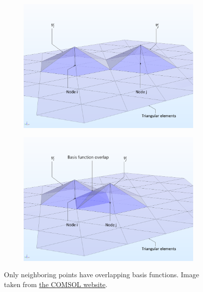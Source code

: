 \documentclass[12pt]{article}
\begin{document}
\begin{figure}
    \centering
    \begin{subfigure}{0.49\linewidth}
        \centering
        \includegraphics[width=\textwidth]{figures/triangle_overlap_1}
    \end{subfigure}
    \begin{subfigure}{0.49\linewidth}
        \centering
        \includegraphics[width=\textwidth]{figures/triangle_overlap_2}
    \end{subfigure}
    \caption{Only neighboring points have overlapping basis functions. Image taken from
        \href{https://www.comsol.com/multiphysics/finite-element-method}{the COMSOL website}.}
    \label{fig:triangle_overlap}
\end{figure}
\end{document}
